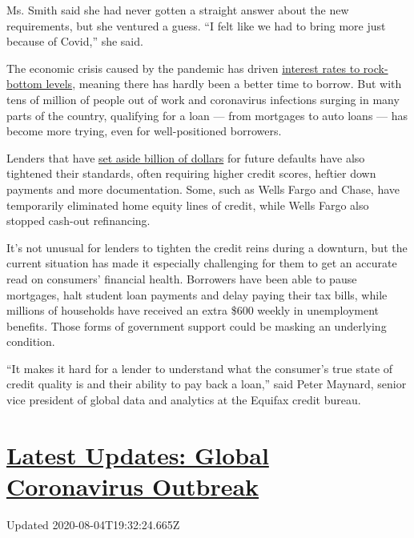 Ms. Smith said she had never gotten a straight answer about the new
requirements, but she ventured a guess. ``I felt like we had to bring
more just because of Covid,'' she said.

The economic crisis caused by the pandemic has driven
\href{https://www.nytimes.com/2020/07/16/business/mortgage-rates-below-3-percent.html}{interest
rates to rock-bottom levels}, meaning there has hardly been a better
time to borrow. But with tens of million of people out of work and
coronavirus infections surging in many parts of the country, qualifying
for a loan --- from mortgages to auto loans --- has become more trying,
even for well-positioned borrowers.

Lenders that have
\href{https://www.nytimes.com/2020/07/14/business/big-banks-quarterly-results.html}{set
aside billion of dollars} for future defaults have also tightened their
standards, often requiring higher credit scores, heftier down payments
and more documentation. Some, such as Wells Fargo and Chase, have
temporarily eliminated home equity lines of credit, while Wells Fargo
also stopped cash-out refinancing.

It's not unusual for lenders to tighten the credit reins during a
downturn, but the current situation has made it especially challenging
for them to get an accurate read on consumers' financial health.
Borrowers have been able to pause mortgages, halt student loan payments
and delay paying their tax bills, while millions of households have
received an extra \$600 weekly in unemployment benefits. Those forms of
government support could be masking an underlying condition.

``It makes it hard for a lender to understand what the consumer's true
state of credit quality is and their ability to pay back a loan,'' said
Peter Maynard, senior vice president of global data and analytics at the
Equifax credit bureau.

\hypertarget{latest-updates-global-coronavirus-outbreak}{%
\section{\texorpdfstring{\href{https://www.nytimes.com/2020/08/04/world/coronavirus-cases.html?action=click\&pgtype=Article\&state=default\&region=MAIN_CONTENT_1\&context=storylines_live_updates}{Latest
Updates: Global Coronavirus
Outbreak}}{Latest Updates: Global Coronavirus Outbreak}}\label{latest-updates-global-coronavirus-outbreak}}

Updated 2020-08-04T19:32:24.665Z

